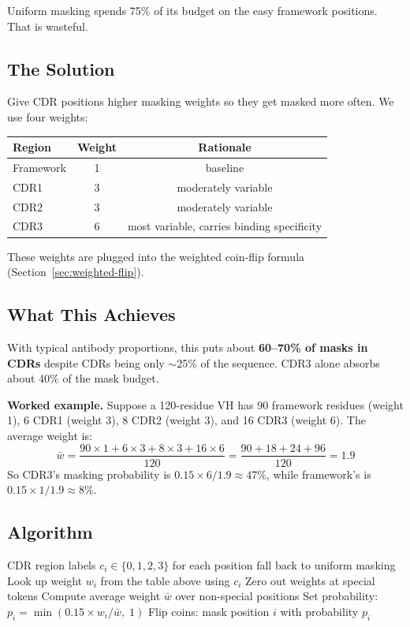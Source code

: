 \documentclass[11pt]{article}
\begin{document}
Uniform masking spends 75\% of its budget on the easy framework
positions. That is wasteful.

\subsection{The Solution}
Give CDR positions higher masking weights so they get masked more
often. We use four weights:

\begin{center}
\begin{tabular}{lcc}
\toprule
Region & Weight & Rationale \\
\midrule
Framework & 1 & baseline \\
CDR1 & 3 & moderately variable \\
CDR2 & 3 & moderately variable \\
CDR3 & 6 & most variable, carries binding specificity \\
\bottomrule
\end{tabular}
\end{center}

These weights are plugged into the weighted coin-flip formula
(Section~\ref{sec:weighted-flip}).

\subsection{What This Achieves}
With typical antibody proportions, this puts about
\textbf{60--70\% of masks in CDRs} despite CDRs being only
$\sim$25\% of the sequence. CDR3 alone absorbs about 40\% of
the mask budget.

\textbf{Worked example.} Suppose a 120-residue VH has 90 framework
residues (weight 1), 6 CDR1 (weight 3), 8 CDR2 (weight 3), and
16 CDR3 (weight 6). The average weight is:
\[
\bar{w} = \frac{90 \times 1 + 6 \times 3 + 8 \times 3 + 16 \times 6}{120}
= \frac{90 + 18 + 24 + 96}{120} = 1.9
\]
So CDR3's masking probability is $0.15 \times 6 / 1.9 \approx 47\%$,
while framework's is $0.15 \times 1 / 1.9 \approx 8\%$.

\subsection{Algorithm}
\begin{algorithm}[H]
\caption{CDR Masking}
\begin{algorithmic}[1]
\Require CDR region labels $c_i \in \{0, 1, 2, 3\}$ for each position
    \State fall back to uniform masking
\EndIf
\State Look up weight $w_i$ from the table above using $c_i$
\State Zero out weights at special tokens
\State Compute average weight $\bar{w}$ over non-special positions
\State Set probability: $p_i = \min(0.15 \times w_i / \bar{w},\; 1)$
\State Flip coins: mask position $i$ with probability $p_i$
\end{algorithmic}
\end{algorithm}
\end{document}
